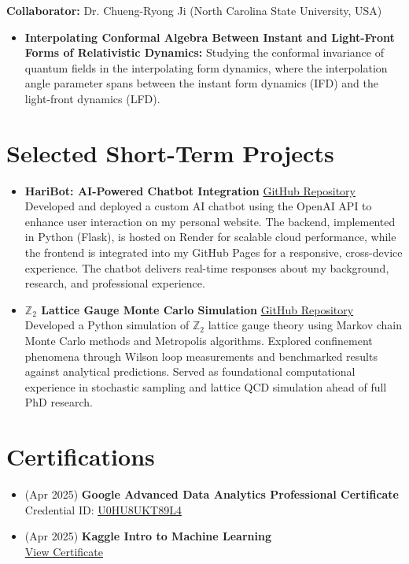 \documentclass[11pt]{article}
\begin{document}
\textbf{Collaborator:} Dr. Chueng-Ryong Ji (North Carolina State University, USA)
\begin{itemize}
    \item \textbf{Interpolating Conformal Algebra Between Instant and Light-Front Forms of Relativistic Dynamics:} Studying the conformal invariance of quantum fields in the interpolating form dynamics, where the interpolation angle parameter spans between the instant form dynamics (IFD) and the light-front dynamics (LFD).
\end{itemize}
%
\section*{Selected Short-Term Projects}
\vspace{-0.3em}

\begin{itemize}
    \item \textbf{HariBot: AI-Powered Chatbot Integration} \hfill \href{https://github.com/Hariprashad-Ravikumar/Hari-ChatBot}{GitHub Repository} \\
    Developed and deployed a custom AI chatbot using the OpenAI API to enhance user interaction on my personal website. The backend, implemented in Python (Flask), is hosted on Render for scalable cloud performance, while the frontend is integrated into my GitHub Pages for a responsive, cross-device experience. The chatbot delivers real-time responses about my background, research, and professional experience.
    \item \textbf{$\mathbb{Z}_2$ Lattice Gauge Monte Carlo Simulation} \hfill \href{https://github.com/Hariprashad-Ravikumar/Z2_LatticeGauge_Monte_Carlo_Simulation}{GitHub Repository} \\
    Developed a Python simulation of $\mathbb{Z}_2$ lattice gauge theory using Markov chain Monte Carlo methods and Metropolis algorithms. Explored confinement phenomena through Wilson loop measurements and benchmarked results against analytical predictions. Served as foundational computational experience in stochastic sampling and lattice QCD simulation ahead of full PhD research.
\end{itemize}

\section*{Certifications}
\vspace{-0.3em}
\begin{itemize}
    \item (Apr 2025) \textbf{Google Advanced Data Analytics Professional Certificate} \\
    Credential ID: \href{https://www.coursera.org/account/accomplishments/professional-cert/certificate/U0HU8UKT89L4}{U0HU8UKT89L4} 
    \item (Apr 2025) \textbf{Kaggle Intro to Machine Learning} \\
    \href{https://www.kaggle.com/learn/certification/hariprashadravikumar/intro-to-machine-learning}{View Certificate} 
\end{itemize}
\end{document}
